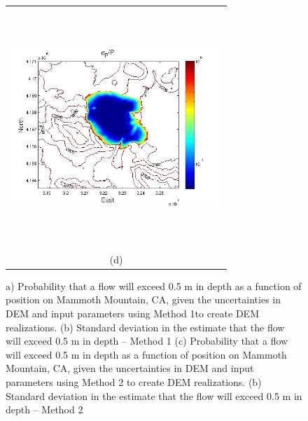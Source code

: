 \documentclass[12pt]{article}
\begin{document}
\begin{figure}[H]
\begin{minipage}{0.6\textwidth}
\begin{tabular}{c}
	\includegraphics[width=8cm,height=9cm,keepaspectratio]{Mammoth_3_sigma_5m.jpg}\\
        (d)
        \end{tabular}
    \end{minipage} 
    \caption{a) Probability that a flow will exceed 0.5 m in depth as
      a function of position on Mammoth Mountain, CA, given the
      uncertainties in DEM and input parameters using Method 1to
      create DEM realizations. (b) Standard deviation in the estimate
      that the flow will exceed 0.5 m in depth -- Method 1 (c)
      Probability that a flow will exceed 0.5 m in depth as a function
      of position on Mammoth Mountain, CA, given the uncertainties in
      DEM and input parameters using Method 2 to create DEM
      realizations.  (b) Standard deviation in the estimate that the
      flow will exceed 0.5 m in depth -- Method 2 }
\label{fig4}  
\end{figure}
\end{document}
